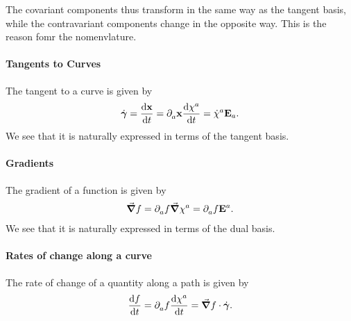 The covariant components thus transform in the same way as the tangent basis, while the contravariant components change in the opposite way. This is the reason fomr the nomenvlature.

\paragraph{Tangents to Curves}
The tangent to a curve is given by
\begin{align*}
	\dot{\vb*{\gamma}} = \dv{\vb{x}}{t} = \partial^{}_{a}\vb{x}\dv{\chi^{a}}{t} = \dot{\chi}^{a}\vb{E}_{a}.
\end{align*}
We see that it is naturally expressed in terms of the tangent basis.

\paragraph{Gradients}
The gradient of a function is given by
\begin{align*}
	\grad{f} = \partial^{}_{a}f\grad{\chi^{a}} = \partial^{}_{a}f\vb{E}^{a}.
\end{align*}
We see that it is naturally expressed in terms of the dual basis.

\paragraph{Rates of change along a curve}
The rate of change of a quantity along a path is given by
\begin{align*}
	\dv{f}{t} = \partial^{}_{a}f\dv{\chi^{a}}{t} = \grad{f}\cdot\dot{\vb*{\gamma}}.
\end{align*}